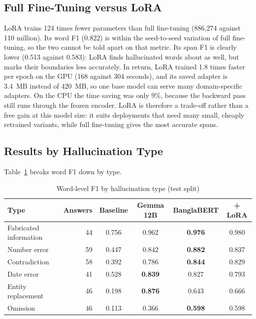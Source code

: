 \subsection{Full Fine-Tuning versus LoRA}

LoRA trains 124 times fewer parameters than full fine-tuning (886,274 against
110 million). Its word F1 (0.822) is within the seed-to-seed variation of full
fine-tuning, so the two cannot be told apart on that metric. Its span F1 is
clearly lower (0.513 against 0.583): LoRA finds hallucinated words about as
well, but marks their boundaries less accurately. In return, LoRA trained
1.8 times faster per epoch on the GPU (168 against 304 seconds), and its saved
adapter is 3.4~MB instead of 420~MB, so one base model can serve many
domain-specific adapters. On the CPU the time saving was only 9\%, because the
backward pass still runs through the frozen encoder. LoRA is therefore a
trade-off rather than a free gain at this model size: it suits deployments
that need many small, cheaply retrained variants, while full fine-tuning gives
the most accurate spans.

\subsection{Results by Hallucination Type}

Table~\ref{tab:types} breaks word F1 down by type.

\begin{table}[htbp]
\centering
\small
\caption{Word-level F1 by hallucination type (test split)}
\label{tab:types}
\begin{tabular}{lrcccc}
\hline
\textbf{Type} & \textbf{Answers} & \textbf{Baseline} & \textbf{Gemma 12B} & \textbf{BanglaBERT} & \textbf{+ LoRA} \\
\hline
Fabricated information & 44 & 0.756 & 0.962 & \textbf{0.976} & 0.980 \\
Number error & 59 & 0.447 & 0.842 & \textbf{0.882} & 0.837 \\
Contradiction & 58 & 0.392 & 0.786 & \textbf{0.844} & 0.829 \\
Date error & 41 & 0.528 & \textbf{0.839} & 0.827 & 0.793 \\
Entity replacement & 46 & 0.198 & \textbf{0.876} & 0.643 & 0.666 \\
Omission & 46 & 0.113 & 0.366 & \textbf{0.598} & 0.598 \\
\hline
\end{tabular}
\end{table}

